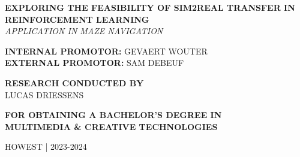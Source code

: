 \documentclass[12pt]{article}
\begin{document}
\begin{titlepage}
    \begin{center}
    \end{center}

    \begin{adjustwidth}{1.5cm}{1.5cm}

    \MakeUppercase{\huge\textbf{Exploring the Feasibility of Sim2Real Transfer in Reinforcement Learning}} \\
    \MakeUppercase{\Large\textit{Application in Maze Navigation}}

    \vspace{1.25em}

    \noindent\MakeUppercase{\large\textbf{Internal promotor:}\large{ Gevaert Wouter}} \\
    \MakeUppercase{\large\textbf{External promotor:}\large{ Sam Debeuf}}

    \vspace{1.25em}

    \noindent\MakeUppercase{\large\textbf{Research conducted by}} \\
    \MakeUppercase{\Large{Lucas Driessens}}

    \vspace{1.25em}

    \noindent\MakeUppercase{\large\textbf{for obtaining a bachelor's degree in}} \\
    \MakeUppercase{\Large\textbf{Multimedia \& Creative Technologies}}

    \vspace{0.75em}

    \noindent\MakeUppercase{\large{Howest | 2023-2024}}
    \end{adjustwidth}
    \restoregeometry
    \normalfont
\end{titlepage}
\end{document}
